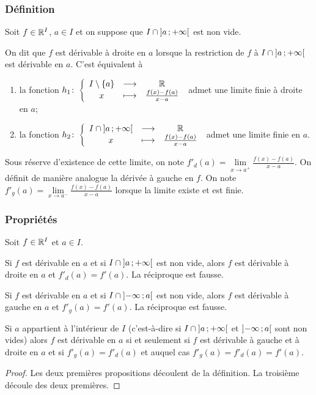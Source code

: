\subsubsection{Définition}
Soit \(f \in \mathbb{R}^I\), \(a \in I\) et on suppose que \(I \cap 
\left] a \, ;  +\infty \right[\) est non vide.
\begin{defdef}
  On dit que \(f\) est dérivable à droite en \(a\) lorsque la restriction de 
  \(f\) à \(I \cap \left] a \, ;  +\infty \right[\) est dérivable en \(a\). C'est 
  équivalent à
  \begin{enumerate}
    \item la fonction 
      \(h_1\colon \left\{\begin{array}{ccc} I\setminus\{a\} & \longrightarrow &\mathbb{R}\\ x & \longmapsto & \frac{f(x)-f(a)}{x-a} \end{array} \right.\) admet 
      une limite finie à droite en \(a\);
    \item la fonction \(h_2\colon \left\{\begin{array}{ccc} I \cap 
      \left] a \, ;  +\infty \right[ & \longrightarrow &\mathbb{R}\\ x & \longmapsto & \frac{f(x)-f(a)}{x-a} \end{array} \right.\) admet une 
      limite finie en \(a\).
  \end{enumerate}
  Sous réserve d'existence de cette limite, on note \(f'_d(a) = \lim\limits_{x 
  \to a^+}\frac{f(x)-f(a)}{x-a}\). On définit de manière analogue la dérivée à 
  gauche en \(f\). On note \(f'_g(a) = \lim\limits_{x \to 
  a^-}\frac{f(x)-f(a)}{x-a}\) lorsque la limite existe et est finie.
\end{defdef}

\subsubsection{Propriétés}

Soit \(f \in \mathbb{R}^I\) et \(a \in I\).
\begin{prop}
  Si \(f\) est dérivable en \(a\) et si \(I\cap \left] a \, ;  +\infty \right[\) est 
  non vide, alors \(f\) est dérivable à droite en \(a\) et \(f'_d(a)=f'(a)\). La 
  réciproque est fausse.
\end{prop}
\begin{prop}
  Si \(f\) est dérivable en \(a\) et si \(I\cap \left] -\infty \, ;  a \right[\) est 
  non vide, alors \(f\) est dérivable à gauche en \(a\) et \(f'_g(a)=f'(a)\). La 
  réciproque est fausse.
\end{prop}
\begin{prop}
  Si \(a\) appartient à l'intérieur de \(I\) (c'est-à-dire si \(I\cap 
  \left] a \, ;  +\infty \right[\) et \(\left] -\infty \, ;  a \right[\) sont non vides) 
  alors \(f\) est dérivable en \(a\) si et seulement si \(f\) est dérivable à 
  gauche et à droite en \(a\) et si \(f'_g(a) = f'_d(a)\) et auquel cas 
  \(f'_g(a)=f'_d(a)=f'(a)\).
\end{prop}
\begin{proof}
  Les deux premières propositions découlent de la définition. La troisième 
  découle des deux premières.
\end{proof}

